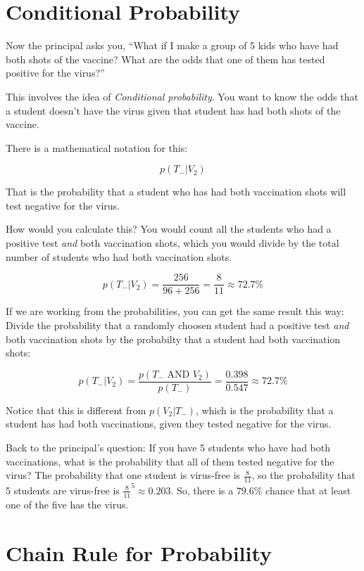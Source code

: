 \section{Conditional Probability}

Now the principal asks you, ``What if I make a group of 5 kids who
have had both shots of the vaccine? What are the odds that one of them
has tested positive for the virus?''

This involves the idea of \textit{Conditional probability}.  You want
to know the odds that a student doesn't have the virus given that
student has had both shots of the vaccine.

There is a mathematical notation for this:

$$p(T_{-} | V_{2})$$

That is the probability that a student who has had both vaccination
shots will test negative for the virus.

How would you calculate this? You would count all the students who had
a positive test \textit{and} both vaccination shots, which you would
divide by the total number of students who had both vaccination shots.

$$p(T_{-} | V_{2}) = \frac{256}{96 + 256} = \frac{8}{11} \approx 72.7\%$$

If we are working from the probabilities, you can get the same result
this way: Divide the probability that a randomly choosen student had a
positive test \textit{and} both vaccination shots by the probabilty
that a student had both vaccination shots:

$$p(T_{-} | V_{2}) = \frac{p(T_{-} \text{ AND } V_{2})}{p(T_{-})} =  \frac{0.398}{0.547} \approx 72.7\%$$

Notice that this is different from $p( V_{2} | T_{-})$, which is the
probability that a student has had both vaccinations, given they
tested negative for the virus.

Back to the principal's question: If you have 5 students who have had
both vaccinations, what is the probability that all of them tested
negative for the virus? The probability that one student is virus-free
is $\frac{8}{11}$, so the probability that 5 students are virus-free
is $\frac{8}{11}^5 \approx 0.203$.  So, there is a $79.6\%$ chance
that at least one of the five has the virus.

\section{Chain Rule for Probability}

